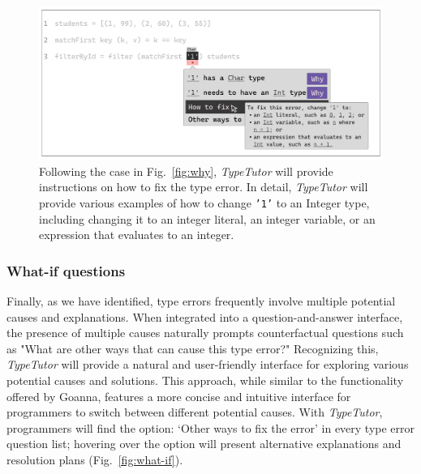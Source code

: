\begin{figure}[hbt]
  \includegraphics[width=\linewidth]{How}
  \caption[An example of \textit{TypeTutor} providing change suggestion (`how' questions)]{
    \label{fig:how}
    Following the case in Fig.~\ref{fig:why}, \textit{TypeTutor} will provide instructions on how to fix the type error. In detail,  \textit{TypeTutor} will provide various examples of how to change \texttt{'1'} to an Integer type, including changing it to an integer literal, an integer variable, or an expression that evaluates to an integer.
    }
\end{figure}

\subsubsection*{What-if questions}
Finally, as we have identified, type errors frequently involve multiple potential causes and explanations. When integrated into a question-and-answer interface, the presence of multiple causes naturally prompts counterfactual questions such as "What are other ways that can cause this type error?" Recognizing this, \textit{TypeTutor} will provide a natural and user-friendly interface for exploring various potential causes and solutions. This approach, while similar to the functionality offered by Goanna, features a more concise and intuitive interface for programmers to switch between different potential causes. With \textit{TypeTutor}, programmers will find the option: `Other ways to fix the error' in every type error question list; hovering over the option will present alternative explanations and resolution plans (Fig.~\ref{fig:what-if}).

